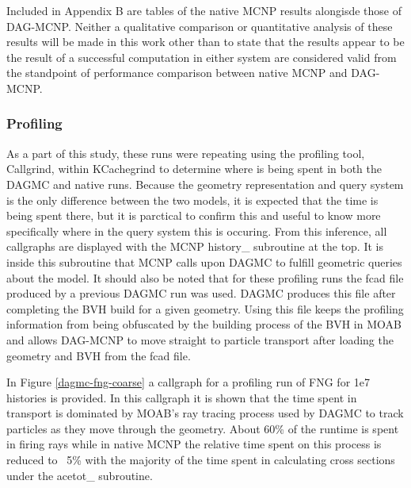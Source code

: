 \documentclass[12pt, a4paper]{article}
\begin{document}
Included in Appendix B are tables of the native MCNP results alongisde those of DAG-MCNP. Neither a qualitative comparison or quantitative analysis of these results will be made in this work other than to state that the results appear to be the result of a successful computation in either system are considered valid from the standpoint of performance comparison between native MCNP and DAG-MCNP.

\subsubsection{Profiling}%

As a part of this study, these runs were repeating using the profiling tool, Callgrind, within KCachegrind to determine where is being spent in both the DAGMC and native runs. Because the geometry representation and query system is the only difference between the two models, it is expected that the time is being spent there, but it is parctical to confirm this and useful to know more specifically where in the query system this is occuring. From this inference, all callgraphs are displayed with the MCNP history\_ subroutine at the top. It is inside this subroutine that MCNP calls upon DAGMC to fulfill geometric queries about the model. It should also be noted that for these profiling runs the fcad file produced by a previous DAGMC run was used. DAGMC produces this file after completing the BVH build for a given geometry. Using this file keeps the profiling information from being obfuscated by the building process of the BVH in MOAB and allows DAG-MCNP to move straight to particle transport after loading the geometry and BVH from the fcad file. 

In Figure \ref{dagmc-fng-coarse} a callgraph for a profiling run of FNG for 1e7 histories is provided. In this callgraph it is shown that the time spent in transport is dominated by MOAB's ray tracing process used by DAGMC to track particles as they move through the geometry. About 60\% of the runtime is spent in firing rays while in native MCNP the relative time spent on this process is reduced to ~5\% with the majority of the time spent in calculating cross sections under the acetot\_ subroutine. 
\end{document}

